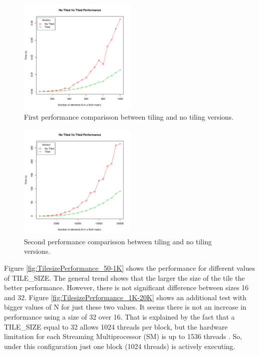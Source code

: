 \documentclass[a4paper,10pt]{scrartcl}
\begin{document}
\begin{enumerate}
 \begin{figure}
 \centering
 \includegraphics[width=0.5\textwidth]{./NTVsT_50-1K}
 \caption{First performance comparisson between tiling and no tiling versions.}\label{fig:NTVsT_50-1K}
 \end{figure}

 \begin{figure}
 \centering
 \includegraphics[width=0.5\textwidth]{./NTVsT_1K-20K}
 \caption{Second performance comparisson between tiling and no tiling versions.}\label{fig:NTVsT_1K-20K}
 \end{figure}

Figure \ref{fig:TilesizePerformance_50-1K} shows the performance for different values of TILE\_SIZE.  The general trend shows that the larger the size of the tile the better performance.  However, there is not significant difference between sizes 16 and 32.  Figure \ref{fig:TilesizePerformance_1K-20K} shows an additional test with bigger values of N for just these two values.  It seems there is not an increase in performance using a size of 32 over 16.  That is explained by the fact that a TILE\_SIZE equal to 32 allows 1024 threads per block, but the hardware limitation for each Streaming Multiprocessor (SM) is up to 1536 threads \cite{kirk2012}. So, under this configuration just one block (1024 threads) is actively executing.
 

\end{enumerate}
\end{document}
